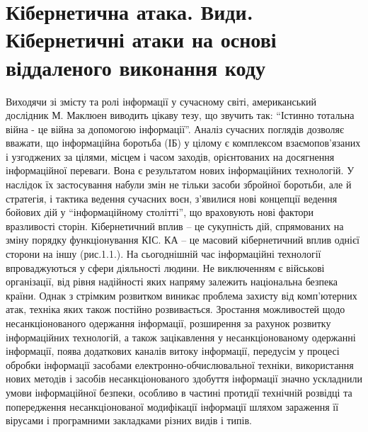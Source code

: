 \documentclass[oneside,final,14pt]{extreport}
\begin{document}
\section{Кібернетична атака. Види. Кібернетичні атаки на основі віддаленого виконання коду}
\label{1section:id2}
Виходячи зі змісту та ролі інформації у сучасному світі, американський дослідник М. Маклюен виводить цікаву тезу, що звучить так: ``Істинно тотальна війна - це війна за допомогою інформації''.
Аналіз сучасних поглядів дозволяє вважати, що інформаційна боротьба (ІБ) у цілому є комплексом взаємопов'язаних і узгоджених за цілями, місцем і часом заходів, орієнтованих на досягнення інформаційної переваги. Вона є результатом нових інформаційних технологій. У наслідок їх застосування набули змін не тільки засоби збройної боротьби, але й стратегія, і тактика ведення сучасних воєн, з'явилися нові концепції ведення бойових дій у ``інформаційному столітті'', що враховують нові фактори вразливості сторін.
Кібернетичний вплив – це сукупність дій, спрямованих на зміну порядку функціонування КІС. КА – це  масовий кібернетичний вплив однієї сторони на іншу (рис.1.1.).
На сьогоднішній час інформаційні технології впроваджуються у сфери  діяльності людини. Не виключенням є військові організації, від рівня надійності яких напряму залежить національна безпека країни. Однак з стрімким розвитком виникає проблема захисту від комп'ютерних атак, техніка яких також постійно розвивається.
Зростання можливостей щодо несанкціонованого одержання інформації, розширення за рахунок розвитку інформаційних технологій,  а також зацікавлення у несанкціонованому одержанні інформації, поява додаткових каналів витоку інформації, передусім у процесі обробки інформації засобами електронно-обчислювальної техніки, використання нових методів і засобів несанкціонованого здобуття інформації значно ускладнили умови інформаційної безпеки, особливо в частині протидії технічній розвідці та попередження несанкціонованої модифікації інформації  шляхом зараження її вірусами і програмними  закладками різних видів і типів.
\end{document}
